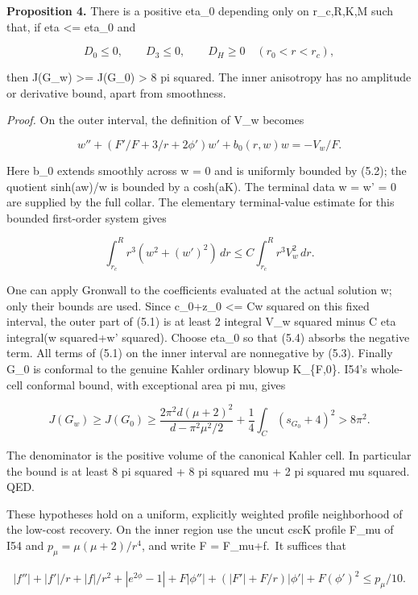 \documentclass[
  10pt,
]{article}
\begin{document}
\textbf{Proposition 4.} There is a positive eta\_0 depending only on
r\_c,R,K,M such that, if eta \textless= eta\_0 and

\[
 D_0\le0,\qquad D_3\le0,\qquad D_H\ge0
                                     \quad(r_0<r<r_c),  \tag{5.3}
\]

then J(G\_w) \textgreater= J(G\_0) \textgreater{} 8 pi squared. The
inner anisotropy has no amplitude or derivative bound, apart from
smoothness.

\emph{Proof.} On the outer interval, the definition of V\_w becomes

\[
 w''+\left(F'/F+3/r+2\phi'\right)w'+b_0(r,w)w=-V_w/F.
\]

Here b\_0 extends smoothly across w = 0 and is uniformly bounded by
(5.2); the quotient sinh(aw)/w is bounded by a cosh(aK). The terminal
data w = w' = 0 are supplied by the full collar. The elementary
terminal-value estimate for this bounded first-order system gives

\[
 \int_{r_c}^{R}r^3(w^2+(w')^2)\,dr
                      \le C\int_{r_c}^{R}r^3V_w^2\,dr.  \tag{5.4}
\]

One can apply Gronwall to the coefficients evaluated at the actual
solution w; only their bounds are used. Since c\_0+z\_0 \textless= Cw
squared on this fixed interval, the outer part of (5.1) is at least 2
integral V\_w squared minus C eta integral(w squared+w' squared). Choose
eta\_0 so that (5.4) absorbs the negative term. All terms of (5.1) on
the inner interval are nonnegative by (5.3). Finally G\_0 is conformal
to the genuine Kahler ordinary blowup K\_\{F,0\}. I54's whole-cell
conformal bound, with exceptional area pi mu, gives

\[
 J(G_w)\ge J(G_0)\ge
       \frac{2\pi^2d(\mu+2)^2}{d-\pi^2\mu^2/2}
       +\frac14\int_C(s_{G_0}+4)^2
                    >8\pi^2.                           \tag{5.5}
\]

The denominator is the positive volume of the canonical Kahler cell. In
particular the bound is at least 8 pi squared + 8 pi squared mu + 2 pi
squared mu squared. QED.

These hypotheses hold on a uniform, explicitly weighted profile
neighborhood of the low-cost recovery. On the inner region use the uncut
cscK profile F\_mu of I54 and \(p_\mu=\mu(\mu+2)/r^4\), and write F =
F\_mu+f.~It suffices that

\[
\begin{aligned}
 |f''|+|f'|/r+|f|/r^2+|e^{2\phi}-1|
 +F|\phi''|+(|F'|+F/r)|\phi'|+F(\phi')^2
                                      \le p_\mu/10.     
\end{aligned}\tag{5.6}
\]
\end{document}
